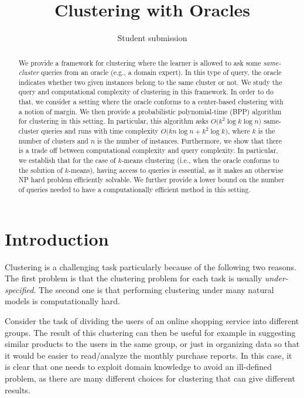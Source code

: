 \documentclass[orivec]{llncs}
\title{Clustering with Oracles}
\author{Student submission}
\begin{document}
\maketitle

\begin{abstract}
We provide a framework for clustering where the learner is allowed to ask some \emph{same-cluster} queries from an oracle (e.g., a domain expert). In this type of query, the oracle indicates whether two given instances belong to the same cluster or not. We study the query and computational complexity of clustering in this framework. In order to do that, we consider a setting where the oracle conforms to a center-based clustering with a notion of margin. We then provide a probabilistic polynomial-time (BPP) algorithm  for clustering in this setting. In particular, this algorithm asks $O\big(k^2\log k\log n)$ same-cluster queries and runs with time complexity $O\big(kn\log n + k^2\log k)$, where $k$ is the number of clusters and $n$ is the number of instances.  Furthermore, we show that there is a trade off between computational complexity and query complexity. In particular, we establish that for the case of $k$-means clustering (i.e., when the oracle conforms to the solution of $k$-means), having access to queries is essential, as it makes an otherwise NP hard problem efficiently solvable. We further provide a lower bound on the number of queries needed to have a computationally efficient method in this setting.
\end{abstract}

\section{Introduction}

Clustering is a challenging task particularly because of the following two reasons. The first problem is that the clustering problem for each task is usually \emph{under-specified}. The second one is that performing clustering under many natural models is computationally hard.

Consider the task of dividing the users of an online shopping service into different groups. The result of this clustering can then be useful for example in suggesting similar products to the users in the same group, or just in organizing data so that it would be easier to read/analyze the monthly purchase reports. In this case, it is clear that one needs to exploit domain knowledge to avoid an ill-defined problem, as there are many different choices for clustering that can give different results. 
\end{document}

